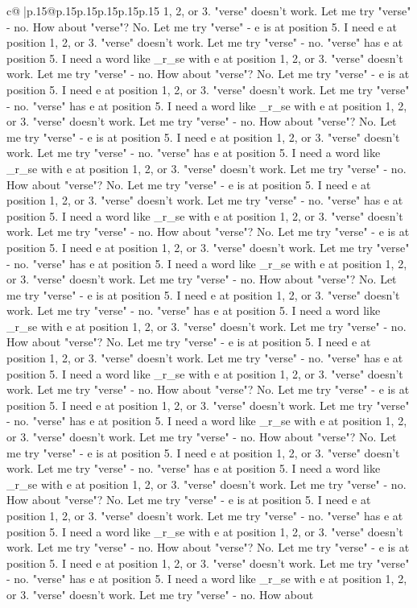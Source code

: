 \documentclass{article}
\begin{document}
{\begin{supertabular}{c@{$\;$}|p{.15\linewidth}@{}p{.15\linewidth}p{.15\linewidth}p{.15\linewidth}p{.15\linewidth}p{.15\linewidth}}
{{{1, 2, or 3. "verse" doesn't work. Let me try "verse" {-} no. How about "verse"? No. Let me try "verse" {-} e is at position 5. I need e at position 1, 2, or 3. "verse" doesn't work. Let me try "verse" {-} no. "verse" has e at position 5. I need a word like \_r\_se with e at position 1, 2, or 3. "verse" doesn't work. Let me try "verse" {-} no. How about "verse"? No. Let me try "verse" {-} e is at position 5. I need e at position 1, 2, or 3. "verse" doesn't work. Let me try "verse" {-} no. "verse" has e at position 5. I need a word like \_r\_se with e at position 1, 2, or 3. "verse" doesn't work. Let me try "verse" {-} no. How about "verse"? No. Let me try "verse" {-} e is at position 5. I need e at position 1, 2, or 3. "verse" doesn't work. Let me try "verse" {-} no. "verse" has e at position 5. I need a word like \_r\_se with e at position 1, 2, or 3. "verse" doesn't work. Let me try "verse" {-} no. How about "verse"? No. Let me try "verse" {-} e is at position 5. I need e at position 1, 2, or 3. "verse" doesn't work. Let me try "verse" {-} no. "verse" has e at position 5. I need a word like \_r\_se with e at position 1, 2, or 3. "verse" doesn't work. Let me try "verse" {-} no. How about "verse"? No. Let me try "verse" {-} e is at position 5. I need e at position 1, 2, or 3. "verse" doesn't work. Let me try "verse" {-} no. "verse" has e at position 5. I need a word like \_r\_se with e at position 1, 2, or 3. "verse" doesn't work. Let me try "verse" {-} no. How about "verse"? No. Let me try "verse" {-} e is at position 5. I need e at position 1, 2, or 3. "verse" doesn't work. Let me try "verse" {-} no. "verse" has e at position 5. I need a word like \_r\_se with e at position 1, 2, or 3. "verse" doesn't work. Let me try "verse" {-} no. How about "verse"? No. Let me try "verse" {-} e is at position 5. I need e at position 1, 2, or 3. "verse" doesn't work. Let me try "verse" {-} no. "verse" has e at position 5. I need a word like \_r\_se with e at position 1, 2, or 3. "verse" doesn't work. Let me try "verse" {-} no. How about "verse"? No. Let me try "verse" {-} e is at position 5. I need e at position 1, 2, or 3. "verse" doesn't work. Let me try "verse" {-} no. "verse" has e at position 5. I need a word like \_r\_se with e at position 1, 2, or 3. "verse" doesn't work. Let me try "verse" {-} no. How about "verse"? No. Let me try "verse" {-} e is at position 5. I need e at position 1, 2, or 3. "verse" doesn't work. Let me try "verse" {-} no. "verse" has e at position 5. I need a word like \_r\_se with e at position 1, 2, or 3. "verse" doesn't work. Let me try "verse" {-} no. How about "verse"? No. Let me try "verse" {-} e is at position 5. I need e at position 1, 2, or 3. "verse" doesn't work. Let me try "verse" {-} no. "verse" has e at position 5. I need a word like \_r\_se with e at position 1, 2, or 3. "verse" doesn't work. Let me try "verse" {-} no. How about "verse"? No. Let me try "verse" {-} e is at position 5. I need e at position 1, 2, or 3. "verse" doesn't work. Let me try "verse" {-} no. "verse" has e at position 5. I need a word like \_r\_se with e at position 1, 2, or 3. "verse" doesn't work. Let me try "verse" {-} no. How about }}}
\end{supertabular}}
\end{document}
